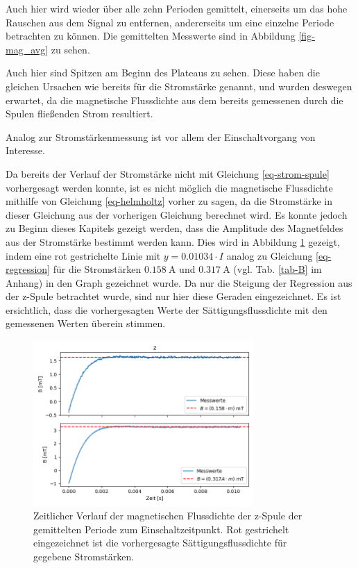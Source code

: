 \documentclass[page,pdftex,12pt,a4paper,twoside,openright]{scrbook}
\begin{document}
Auch hier wird wieder über alle zehn Perioden gemittelt, einerseits um das hohe Rauschen aus dem Signal zu entfernen, andererseits um eine einzelne Periode betrachten zu können. Die gemittelten Messwerte sind in Abbildung \ref{fig-mag_avg} zu sehen.

Auch hier sind Spitzen am Beginn des Plateaus zu sehen. Diese haben die gleichen Ursachen wie bereits für die Stromstärke genannt, und wurden deswegen erwartet, da die magnetische Flussdichte aus dem bereits gemessenen durch die Spulen fließenden Strom resultiert.

Analog zur Stromstärkenmessung ist vor allem der Einschaltvorgang von Interesse.

Da bereits der Verlauf der Stromstärke nicht mit Gleichung \ref{eq-strom-spule} vorhergesagt werden konnte, ist es nicht möglich die magnetische Flussdichte mithilfe von Gleichung \ref{eq-helmholtz} vorher zu sagen, da die Stromstärke in dieser Gleichung aus der vorherigen Gleichung berechnet wird. Es konnte jedoch zu Beginn dieses Kapitels gezeigt werden, dass die Amplitude des Magnetfeldes aus der Stromstärke bestimmt werden kann. Dies wird in Abbildung \ref{fig-mag_fit} gezeigt, indem eine rot gestrichelte Linie mit \(y = 0.01034 \cdot I\) analog zu Gleichung \ref{eq-regression} für die Stromstärken \(\SI{0.158}{\ampere}\) und \(\SI{0.317}{\ampere}\) (vgl. Tab. \ref{tab-B} im Anhang) in den Graph gezeichnet wurde. Da nur die Steigung der Regression aus der z-Spule betrachtet wurde, sind nur hier diese Geraden eingezeichnet. Es ist ersichtlich, dass die vorhergesagten Werte der Sättigungsflussdichte mit den gemessenen Werten überein stimmen. 
\begin{figure}[h]
\centering
\includegraphics[width=0.75\textwidth]{img/mag_fit.png}
\caption{\label{fig-mag_fit}
Zeitlicher Verlauf der magnetischen Flussdichte der z-Spule der gemittelten Periode zum Einschaltzeitpunkt. Rot gestrichelt eingezeichnet ist die vorhergesagte Sättigungsflussdichte für gegebene Stromstärken.}
\end{figure}
\end{document}
